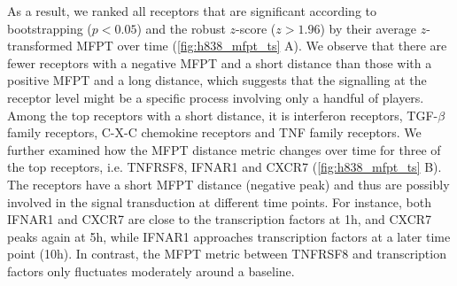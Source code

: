 As a result, we ranked all receptors that are significant
according to bootstrapping ($p<0.05$) and the robust 
$z$-score ($z>1.96$) by their average $z$-transformed MFPT
over time (\ref{fig:h838_mfpt_ts} A).
We observe that there are fewer receptors with a negative
MFPT and a short distance than those with a positive
MFPT and a long distance, which suggests that the signalling
at the receptor level might be a specific process 
involving only a handful of players.
Among the top receptors with a short distance, it is 
interferon receptors, TGF-$\beta$ family receptors, 
C-X-C chemokine receptors and TNF family receptors.
We further examined how the MFPT distance metric changes
over time for three of the top receptors, i.e. TNFRSF8, 
IFNAR1 and CXCR7 (\ref{fig:h838_mfpt_ts} B). 
The receptors have a short MFPT distance (negative peak) 
and thus are
possibly involved in the signal transduction at different 
time points. For instance, both IFNAR1 and CXCR7 are close
to the transcription factors at 1h, and CXCR7 peaks again
at 5h, while IFNAR1 approaches transcription factors at
a later time point (10h). In contrast, the MFPT metric
between TNFRSF8 and transcription factors only fluctuates
moderately around a baseline.




